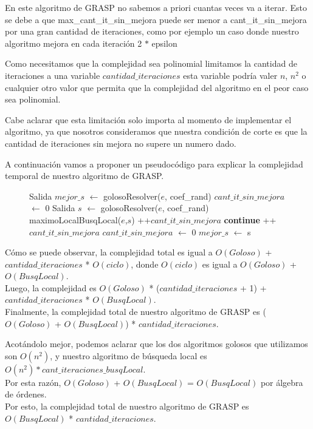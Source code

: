 En este algoritmo de GRASP no sabemos a priori cuantas veces va a iterar. Esto se debe a que max\_cant\_it\_sin\_mejora puede ser menor a cant\_it\_sin\_mejora por una gran cantidad de iteraciones, como por ejemplo un caso donde nuestro algoritmo mejora en cada iteración 2 $*$ epsilon

Como necesitamos que la complejidad sea polinomial limitamos la cantidad de iteraciones a una variable $cantidad\_iteraciones$ esta variable podría valer $n$, $n^2$ o cualquier otro valor que permita que la complejidad del algoritmo en el peor caso sea polinomial.

Cabe aclarar que esta limitación solo importa al momento de implementar el algoritmo, ya que nosotros consideramos que nuestra condición de corte es que la cantidad de iteraciones sin mejora no supere un numero dado.

A continuación vamos a proponer un pseudocódigo para explicar la complejidad temporal de nuestro algoritmo de GRASP.

\begin{center}
 \begin{figure}[H]
  \begin{pseudo}
    \State Salida $mejor\_s$ $\leftarrow$ golosoResolver($e$, coef\_rand) 
    \State $cant\_it\_sin\_mejora$ $\leftarrow$ 0 
     
      \State Salida $s$ $\leftarrow$ golosoResolver($e$, coef\_rand) 
      \State maximoLocalBusqLocal($e$,$s$) 
       
	\State++$cant\_it\_sin\_mejora$ 
	\State \textbf{continue}
      \EndIf
       
	\State ++$cant\_it\_sin\_mejora$ 
      \Else
	\State $cant\_it\_sin\_mejora$ $\leftarrow$ 0 
      \EndIf
       
	\State $mejor\_s$ $\leftarrow$ s 
      \EndIf
    \EndWhile
    \EndProcedure
  \end{pseudo}
 \end{figure}
\end{center}

Cómo se puede observar, la complejidad total es igual a $O(Goloso)$ + $cantidad\_iteraciones$ * $O(ciclo)$, donde $O(ciclo)$ es igual a  $O(Goloso)$ + $O(BusqLocal)$.\\
Luego, la complejidad es $O(Goloso)$ * ($cantidad\_iteraciones$ + 1) + $cantidad\_iteraciones$ * $O(BusqLocal)$.\\
Finalmente, la complejidad total de nuestro algoritmo de GRASP es ($O(Goloso)$ + $O(BusqLocal)$) * $cantidad\_iteraciones$.

Acotándolo mejor, podemos aclarar que los dos algoritmos golosos que utilizamos son $O(n^2)$, y nuestro algoritmo de búsqueda local es $O(n^2) * cant\_iteraciones\_busqLocal$.\\
Por esta razón, $O(Goloso)$ + $O(BusqLocal)$ = $O(BusqLocal)$ por álgebra de órdenes.\\
Por esto, la complejidad total de nuestro algoritmo de GRASP es $O(BusqLocal)$ * $cantidad\_iteraciones$.